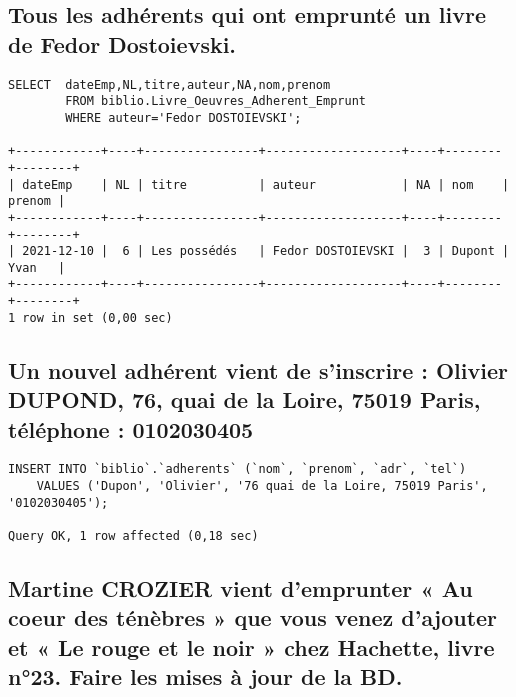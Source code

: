 \documentclass[11]{article}
\begin{document}
\subsection{Tous les adhérents qui ont emprunté un livre de Fedor Dostoievski.}
\begin{verbatim}
SELECT	dateEmp,NL,titre,auteur,NA,nom,prenom 
		FROM biblio.Livre_Oeuvres_Adherent_Emprunt 
		WHERE auteur='Fedor DOSTOIEVSKI';

+------------+----+----------------+-------------------+----+--------+--------+
| dateEmp    | NL | titre          | auteur            | NA | nom    | prenom |
+------------+----+----------------+-------------------+----+--------+--------+
| 2021-12-10 |  6 | Les possédés   | Fedor DOSTOIEVSKI |  3 | Dupont | Yvan   |
+------------+----+----------------+-------------------+----+--------+--------+
1 row in set (0,00 sec)
\end{verbatim}

\subsection{ Un nouvel adhérent vient de s’inscrire : Olivier DUPOND, 76, quai de la Loire,
	75019 Paris, téléphone : 0102030405}
\begin{verbatim}
INSERT INTO `biblio`.`adherents` (`nom`, `prenom`, `adr`, `tel`) 
	VALUES ('Dupon', 'Olivier', '76 quai de la Loire, 75019 Paris', '0102030405');

Query OK, 1 row affected (0,18 sec)
\end{verbatim}


\subsection{Martine CROZIER vient d’emprunter « Au coeur des ténèbres » que vous venez
	d’ajouter et « Le rouge et le noir » chez Hachette, livre n°23. Faire les mises à
	jour de la BD.}
\end{document}
